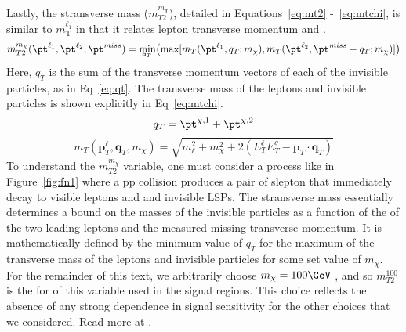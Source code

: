 Lastly, the stransverse mass ($m_{T2}^{m_{\chi}}$), detailed in Equations~\ref{eq:mt2} -~\ref{eq:mtchi}, is similar to $m_\text{T}^{\ell_1}$ in that it relates lepton transverse momentum and \met{} \cite{baar}.
\begin{equation}
\label{eq:mt2}
m^{m_\chi}_{T2}(\pt^{\ell_1}, \pt^{\ell_2}, \pt^{miss})  = \underaccent{\mathbf{q}_T}{\text{min}}\big(\text{max}[m_T(\pt^{\ell_1}, q_T; m_\chi), m_T(\pt^{\ell_2}, \pt^{miss}-q_T; m_\chi)]\big)
\end{equation}
Here, $q_T$ is the sum of the transverse momentum vectors of each of the invisible particles, as in Eq~\ref{eq:qt}.  The transverse mass of the leptons and invisible particles is shown explicitly in Eq~\ref{eq:mtchi}.
\begin{equation}
\label{eq:qt}
q_T = \pt^{\chi,1}+\pt^{\chi,2}
\end{equation}
\begin{equation}
 m_T\left(\mathbf{p}_T^{\ell}, \mathbf{q}_T, m_\chi\right)= \sqrt{m_\ell^2 + m_\chi^2 + 2\left(E_T^\ell E_T^q -\mathbf{p}_T\cdot \mathbf{q}_T\right)}
 \label{eq:mtchi}
 \end{equation}
To understand the $m_{T2}^{m_{\chi}}$ variable, one must consider a process like in Figure~\ref{fig:fn1} where a pp collision produces a pair of slepton that immediately decay to visible leptons and and invisible LSPs.  The stransverse mass essentially determines a bound on the masses of the invisible particles as a function of the \pt of the two leading leptons and the measured missing transverse momentum.  It is mathematically defined by the minimum value of $q_T$ for the maximum of the transverse mass of the leptons and invisible particles for some set value of $m_\chi$.  For the remainder of this text, we arbitrarily choose $m_\chi = 100\GeV$ , and so $m_{T2}^{100}$ is the for of this variable used in the signal regions.  This choice reflects the absence of any strong dependence in signal sensitivity for the other choices that we considered.  %
  Read more at .


  
